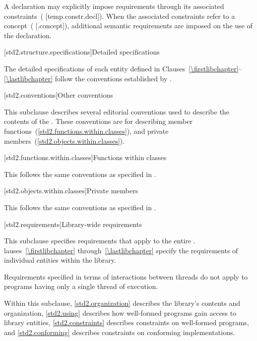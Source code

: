 \pnum
A declaration may explicitly impose requirements through its associated
constraints~( [temp.\brk{}constr.\brk{}decl]). When the associated constraints
refer to a concept~( [.concept]), additional semantic requirements are
imposed on the use of the declaration.

[std2.structure.specifications]{Detailed specifications}

\pnum
The detailed specifications of each entity defined in
Clauses~\ref{\firstlibchapter}--\ref{\lastlibchapter} follow the conventions
established by .

[std2.conventions]{Other conventions}
%

\pnum
This subclause describes several editorial conventions used to describe the contents
of the . These conventions are for describing
member functions~(\ref{std2.functions.within.classes}),
and private members~(\ref{std2.objects.within.classes}).

[std2.functions.within.classes]{Functions within classes}

\pnum
This  follows the same conventions as specified in .

[std2.objects.within.classes]{Private members}

\pnum
This  follows the same conventions as specified in .

[std2.requirements]{Library-wide requirements}

\pnum
This subclause specifies requirements that apply to the entire .
lauses~\ref{\firstlibchapter} through~\ref{\lastlibchapter}
specify the requirements of individual entities within the library.

\pnum
Requirements specified in terms of interactions between threads do not apply to
programs having only a single thread of execution.

\pnum
Within this subclause, \ref{std2.organization} describes the library's contents and
organization, \ref{std2.using} describes how well-formed \Cpp programs gain access to
library entities, \ref{std2.constraints} describes constraints on well-formed \Cpp
programs, and \ref{std2.conforming} describes constraints on conforming
implementations.

